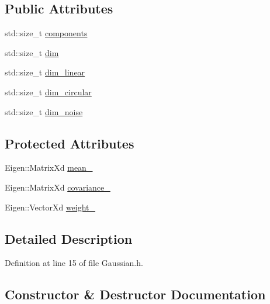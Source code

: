 \subsection*{Public Attributes}
\begin{DoxyCompactItemize}
\item 
std\+::size\+\_\+t \mbox{\hyperlink{classbfl_1_1GaussianMixture_a02cc284327dbaa6b90c653dd2faccf88}{components}}
\item 
std\+::size\+\_\+t \mbox{\hyperlink{classbfl_1_1GaussianMixture_a3f2b18801e72fa3bf0d6edc778662a8d}{dim}}
\item 
std\+::size\+\_\+t \mbox{\hyperlink{classbfl_1_1GaussianMixture_a22a0fbc77f90d9d75e89d7898484c05a}{dim\+\_\+linear}}
\item 
std\+::size\+\_\+t \mbox{\hyperlink{classbfl_1_1GaussianMixture_a23f3b92753266475a9bff8ee7e1c9518}{dim\+\_\+circular}}
\item 
std\+::size\+\_\+t \mbox{\hyperlink{classbfl_1_1GaussianMixture_adaa8d9c6d03be835769cc848aba81067}{dim\+\_\+noise}}
\end{DoxyCompactItemize}
\subsection*{Protected Attributes}
\begin{DoxyCompactItemize}
\item 
Eigen\+::\+Matrix\+Xd \mbox{\hyperlink{classbfl_1_1GaussianMixture_a12a1175e838a753129f4cc133b2c1a9c}{mean\+\_\+}}
\item 
Eigen\+::\+Matrix\+Xd \mbox{\hyperlink{classbfl_1_1GaussianMixture_aab086cc1a89a8b7efd15303853e52920}{covariance\+\_\+}}
\item 
Eigen\+::\+Vector\+Xd \mbox{\hyperlink{classbfl_1_1GaussianMixture_ac9ce000575d6b29ad8e1a756d750faff}{weight\+\_\+}}
\end{DoxyCompactItemize}


\subsection{Detailed Description}


Definition at line 15 of file Gaussian.\+h.



\subsection{Constructor \& Destructor Documentation}
\mbox{\label{classbfl_1_1Gaussian_aa201bf4a8fe1192c9a701e9537691426}} 
